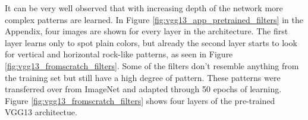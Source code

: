\begin{figure}[H]
\label{fig:vgg13_pretrained_filters}
\end{figure}

It can be very well observed that with increasing depth of the network more complex patterns are learned. In Figure \ref{fig:vgg13_app_pretrained_filters} in the Appendix, four images are shown for every layer in the architecture. The first layer learns only to spot plain colors, but already the second layer starts to look for vertical and horizontal rock-like patterns, as seen in Figure \ref{fig:vgg13_fromscratch_filters}. Some of the filters don't resemble anything from the training set but still have a high degree of pattern. These patterns were transferred over from ImageNet and adapted through 50 epochs of learning. Figure \ref{fig:vgg13_fromscratch_filters} shows four layers of the pre-trained VGG13 architectue.

